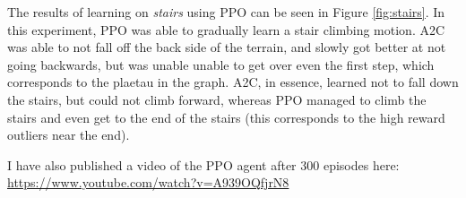 \documentclass{article}
\begin{document}
The results of learning on \textit{stairs} using PPO can be seen in Figure \ref{fig:stairs}.
In this experiment, PPO was able to gradually learn a stair climbing motion.
A2C was able to not fall off the back side of the terrain, and slowly got better at not going backwards, but was unable unable to get over even the first step, which corresponds to the plaetau in the graph.
A2C, in essence, learned not to fall down the stairs, but could not climb forward, whereas PPO managed to climb the stairs and even get to the end of the stairs (this corresponds to the high reward outliers near the end).
 
I have also published a video of the PPO agent after 300 episodes here: \href{https://www.youtube.com/watch?v=A939OQfjrN8}{https://www.youtube.com/watch?v=A939OQfjrN8}
\end{document}
